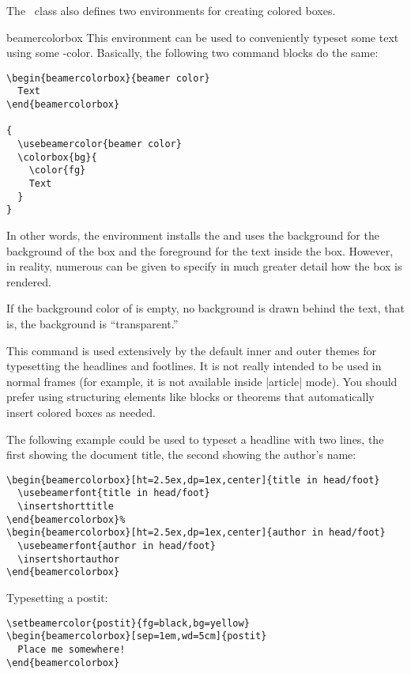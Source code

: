 The \beamer\ class also defines two environments for creating colored boxes.

\begin{environment}{{beamercolorbox}}
  This environment can be used to conveniently typeset some text using some \beamer-color. Basically, the following two command blocks do the same:
\begin{verbatim}
\begin{beamercolorbox}{beamer color}
  Text
\end{beamercolorbox}

{
  \usebeamercolor{beamer color}
  \colorbox{bg}{
    \color{fg}
    Text
  }
}
\end{verbatim}

  In other words, the environment installs the  and uses the background for the background of the box and the foreground for the text inside the box. However, in reality, numerous  can be given to specify in much greater detail how the box is rendered.

  If the background color of  is empty, no background is drawn behind the text, that is, the background is ``transparent.''

  This command is used extensively by the default inner and outer themes for typesetting the headlines and footlines. It is not really intended to be used in normal frames (for example, it is not available inside |article| mode). You should prefer using structuring elements like blocks or theorems that automatically insert colored boxes as needed.

  \example
  The following example could be used to typeset a headline with two lines, the first showing the document title, the second showing the author's name:
\begin{verbatim}
\begin{beamercolorbox}[ht=2.5ex,dp=1ex,center]{title in head/foot}
  \usebeamerfont{title in head/foot}
  \insertshorttitle
\end{beamercolorbox}%
\begin{beamercolorbox}[ht=2.5ex,dp=1ex,center]{author in head/foot}
  \usebeamerfont{author in head/foot}
  \insertshortauthor
\end{beamercolorbox}
\end{verbatim}

  \example
  Typesetting a postit:
\begin{verbatim}
\setbeamercolor{postit}{fg=black,bg=yellow}
\begin{beamercolorbox}[sep=1em,wd=5cm]{postit}
  Place me somewhere!
\end{beamercolorbox}
\end{verbatim}


\end{environment}
